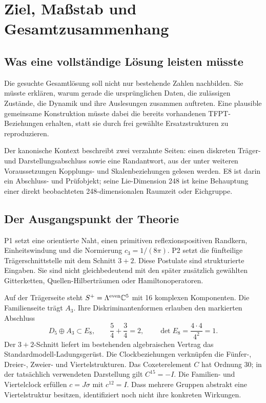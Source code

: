 \chapter{Ziel, Maßstab und Gesamtzusammenhang}
\section{Was eine vollständige Lösung leisten müsste}
Die gesuchte Gesamtlösung soll nicht nur bestehende Zahlen nachbilden. Sie müsste erklären, warum gerade die ursprünglichen Daten, die zulässigen Zustände, die Dynamik und ihre Auslesungen zusammen auftreten. Eine plausible gemeinsame Konstruktion müsste dabei die bereits vorhandenen TFPT-Beziehungen erhalten, statt sie durch frei gewählte Ersatzstrukturen zu reproduzieren.

Der kanonische Kontext beschreibt zwei verzahnte Seiten: einen diskreten Träger- und Darstellungsabschluss sowie eine Randantwort, aus der unter weiteren Voraussetzungen Kopplungs- und Skalenbeziehungen gelesen werden. E8 ist darin ein Abschluss- und Prüfobjekt; seine Lie-Dimension 248 ist keine Behauptung einer direkt beobachteten 248-dimensionalen Raumzeit oder Eichgruppe. 

\section{Der Ausgangspunkt der Theorie}
P1 setzt eine orientierte Naht, einen primitiven reflexionspositiven Randkern, Einheitswindung und die Normierung $c_3=1/(8\pi)$. P2 setzt die fünfteilige Trägerschnittstelle mit dem Schnitt $3+2$. Diese Postulate sind strukturierte Eingaben. Sie sind nicht gleichbedeutend mit den später zusätzlich gewählten Gitterketten, Quellen-Hilberträumen oder Hamiltonoperatoren.

Auf der Trägerseite steht $S^+=\Lambda^{\mathrm{even}}\mathbb C^5$ mit 16 komplexen Komponenten. Die Familienseite trägt $A_3$. Ihre Diskriminantenformen erlauben den markierten Abschluss
\[
 D_5\oplus A_3\subset E_8,\qquad
 \frac54+\frac34=2,\qquad
 \det E_8=\frac{4\cdot4}{4^2}=1.
\]
Der $3+2$-Schnitt liefert im bestehenden algebraischen Vertrag das Standardmodell-Ladungsgerüst. Die Clockbeziehungen verknüpfen die Fünfer-, Dreier-, Zweier- und Viertelstrukturen. Das Coxeterelement $C$ hat Ordnung 30; in der tatsächlich verwendeten Darstellung gilt $C^{15}=-I$. Die Familien- und Viertelclock erfüllen $c=J\sigma$ mit $c^{12}=I$. Dass mehrere Gruppen abstrakt eine Viertelstruktur besitzen, identifiziert noch nicht ihre konkreten Wirkungen. 

